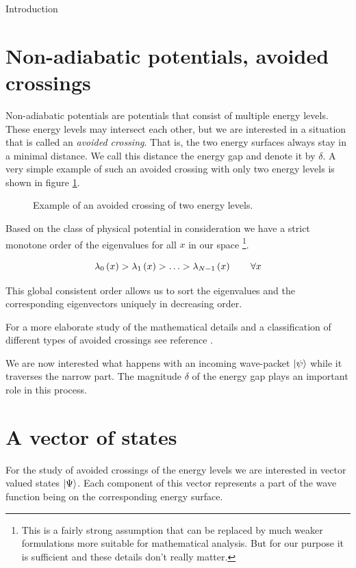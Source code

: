 \begin{chapter}{Introduction}
\section{Non-adiabatic potentials, avoided crossings}

Non-adiabatic potentials are potentials that consist of multiple energy levels.
These energy levels may intersect each other, but we are interested in a situation
that is called an \emph{avoided crossing}. That is, the two energy surfaces always
stay in a minimal distance. We call this distance the energy gap and denote it by
$\delta$. A very simple example of such an avoided crossing with only two energy
levels is shown in figure \ref{fig:example_avoided_crossing}.

\begin{figure}
  \centering
  
  \caption{Example of an avoided crossing of two energy levels.}
  \label{fig:example_avoided_crossing}
\end{figure}

Based on the class of physical potential in consideration we have a strict monotone
order of the eigenvalues for all $x$ in our space \footnote{This is a fairly strong
assumption that can be replaced by much weaker formulations more suitable for mathematical
analysis. But for our purpose it is sufficient and these details don't really matter.}.

\begin{equation}
  \lambda_0\left( x \right) > \lambda_1\left( x \right) > \ldots > \lambda_{N-1}\left( x \right) \qquad \forall x
\end{equation}

This global consistent order allows us to sort the eigenvalues and the corresponding
eigenvectors uniquely in decreasing order.

For a more elaborate study of the mathematical details and a classification of
different types of avoided crossings see reference \cite{H_classification}.

We are now interested what happens with an incoming wave-packet $\Ket{\psi}$ while
it traverses the narrow part. The magnitude $\delta$ of the energy gap plays an
important role in this process.

\section{A vector of states}

For the study of avoided crossings of the energy levels we are interested in vector valued
states $\Ket{\Psi}$. Each component of this vector represents a part of the wave function
being on the corresponding energy surface.


\end{chapter}
